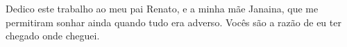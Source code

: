 


\begin{dedicatoria}
Dedico este trabalho ao meu pai Renato, e a minha mãe Janaina, que me permitiram sonhar ainda quando tudo era adverso. Vocês são a razão  de eu ter chegado onde cheguei.

\end{dedicatoria}

